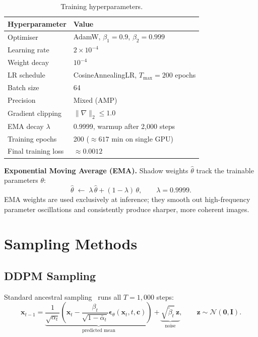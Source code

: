 \documentclass[12pt, a4paper]{report}
\begin{document}
\begin{table}[H]
\centering
\caption{Training hyperparameters.}
\begin{tabular}{ll}
\toprule
Hyperparameter & Value \\
\midrule
Optimiser                & AdamW, $\beta_1{=}0.9$, $\beta_2{=}0.999$ \\
Learning rate            & $2\times10^{-4}$ \\
Weight decay             & $10^{-4}$ \\
LR schedule              & CosineAnnealingLR, $T_{\max}=200$ epochs \\
Batch size               & 64 \\
Precision                & Mixed (AMP) \\
Gradient clipping        & $\|\nabla\|_2 \le 1.0$ \\
EMA decay $\lambda$      & 0.9999, warmup after 2{,}000 steps \\
Training epochs          & 200 ($\approx617$ min on single GPU) \\
Final training loss      & $\approx 0.0012$ \\
\bottomrule
\end{tabular}
\end{table}

\textbf{Exponential Moving Average (EMA).}
Shadow weights $\hat\theta$ track the trainable parameters $\theta$:
\[
  \hat\theta \;\leftarrow\; \lambda\,\hat\theta + (1-\lambda)\,\theta,
  \qquad \lambda = 0.9999.
\]
EMA weights are used exclusively at inference; they smooth out high-frequency
parameter oscillations and consistently produce sharper, more coherent images.

\section{Sampling Methods}

\subsection{DDPM Sampling}

Standard ancestral sampling~\cite{ho2020ddpm} runs all $T=1{,}000$ steps:
\[
  \mathbf{x}_{t-1}
    = \underbrace{
        \frac{1}{\sqrt{\alpha_t}}\!\left(
          \mathbf{x}_t
          - \frac{\beta_t}{\sqrt{1-\bar\alpha_t}}
            \boldsymbol\epsilon_\theta(\mathbf{x}_t, t, \mathbf{c})
        \right)
      }_{\text{predicted mean}}
    + \underbrace{\sqrt{\tilde\beta_t}\,\mathbf{z}}_{\text{noise}},
  \qquad \mathbf{z} \sim \mathcal{N}(\mathbf{0},\mathbf{I}).
\]
\end{document}

